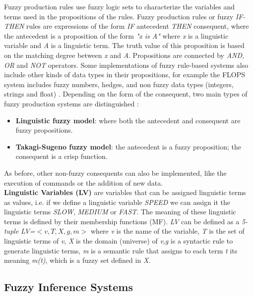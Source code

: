 Fuzzy production rules use fuzzy logic sets to characterize the
variables and terms used in the propositions of the rules. Fuzzy
production rules or fuzzy \textit{IF-THEN} rules are expressions of
the form \textit{IF} antecedent \textit{THEN} consequent, where the
antecedent is a proposition of the form \textit{"x is A"} where
\textit{x} is a linguistic variable and \textit{A} is a linguistic
term. The truth value of this proposition is based on the matching
degree between \textit{x} and \textit{A}. Propositions are connected
by \textit{AND}, \textit{OR} and \textit{NOT} operators. Some
implementations of fuzzy rule-based systems also include other kinds
of data types in their propositions, for example the FLOPS system
includes fuzzy numbers, hedges, and non fuzzy data types (integers,
strings and float) \cite{siler2005fuzzy}. Depending on the form of the
consequent, two main types of fuzzy production systems are
distinguished \cite{babuvska1996fuzzy}:
\begin{itemize}  
\item \textbf{Linguistic fuzzy model}: where both the antecedent 
and consequent are fuzzy propositions.
\item \textbf{Takagi-Sugeno fuzzy model}: the antecedent is a fuzzy 
proposition; the consequent is a crisp function.
\end{itemize}  
As before, other non-fuzzy consequents can also be implemented, like
the execution of commands or the addition of new data.\\
\textbf{Linguistic Variables (LV)} are variables that can be assigned
linguistic terms as values, i.e. if we define a linguistic variable
\textit{SPEED} we can assign it the linguistic terms \textit{SLOW},
\textit{MEDIUM} or \textit{FAST}. The meaning of these linguistic
terms is defined by their membership functions (MF). \textit{LV} can
be defined as a \textit{5-tuple} \textit{LV=}$<v,T,X,g,m>$ where
\textit{v} is the name of the variable, \textit{T} is the set of
linguistic terms of \textit{v}, \textit{X} is the domain (universe) of
\textit{v},\textit{g} is a syntactic rule to generate linguistic terms,
\textit{m} is a semantic rule that assigns to each term \textit{t} its
meaning \textit{m(t)}, which is a fuzzy set defined in \textit{X}.

\subsection{Fuzzy Inference Systems}

